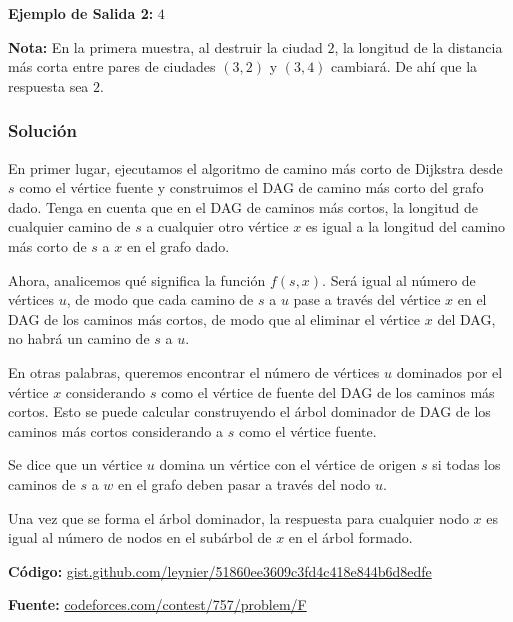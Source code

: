 \documentclass[12pt]{article}
\newcommand{\nl}{\vspace{0.3cm}}
\begin{document}
\textbf{Ejemplo de Salida 2:} $4$

\nl

\textbf{Nota:} En la primera muestra, al destruir la ciudad $2$, la longitud de la distancia más corta entre pares de ciudades $(3, 2)$ y $(3, 4)$ cambiará. De ahí que la respuesta sea $2$.

\subsubsection{Solución}

\nl

En primer lugar, ejecutamos el algoritmo de camino más corto de Dijkstra desde $s$ como el vértice fuente y construimos el DAG de camino más corto del grafo dado. Tenga en cuenta que en el DAG de caminos más cortos, la longitud de cualquier camino de $s$ a cualquier otro vértice $x$ es igual a la longitud del camino más corto de $s$ a $x$ en el grafo dado.

\nl

Ahora, analicemos qué significa la función $f(s, x)$. Será igual al número de vértices $u$, de modo que cada camino de $s$ a $u$ pase a través del vértice $x$ en el DAG de los caminos más cortos, de modo que al eliminar el vértice $x$ del DAG, no habrá un camino de $s$ a $u$.

\nl

En otras palabras, queremos encontrar el número de vértices $u$ dominados por el vértice $x$ considerando $s$ como el vértice de fuente del DAG de los caminos más cortos. Esto se puede calcular construyendo el árbol dominador de DAG de los caminos más cortos considerando a $s$ como el vértice fuente.\cite{afaffd}

\nl

Se dice que un vértice $u$ domina un vértice con el vértice de origen $s$ si todas los caminos de $s$ a $w$ en el grafo deben pasar a través del nodo $u$.

\nl

Una vez que se forma el árbol dominador, la respuesta para cualquier nodo $x$ es igual al número de nodos en el subárbol de $x$ en el árbol formado.

\nl

\textbf{Código:} \href{https://gist.github.com/leynier/51860ee3609c3fd4c418e844b6d8edfe}{gist.github.com/leynier/51860ee3609c3fd4c418e844b6d8edfe}

\nl

\textbf{Fuente:} \href{https://codeforces.com/contest/757/problem/F}{codeforces.com/contest/757/problem/F}

\newpage

\nocite{*}


\end{document}
